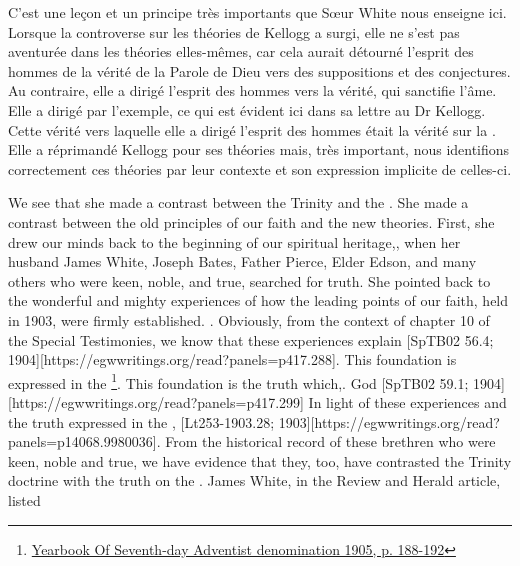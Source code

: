 C'est une leçon et un principe très importants que Sœur White nous enseigne ici. Lorsque la controverse sur les théories de Kellogg a surgi, elle ne s'est pas aventurée dans les théories elles-mêmes, car cela aurait détourné l'esprit des hommes de la vérité de la Parole de Dieu vers des suppositions et des conjectures. Au contraire, elle a dirigé l'esprit des hommes vers la vérité, qui sanctifie l'âme. Elle a dirigé par l'exemple, ce qui est évident ici dans sa lettre au Dr Kellogg. Cette vérité vers laquelle elle a dirigé l'esprit des hommes était la vérité sur la . Elle a réprimandé Kellogg pour ses théories mais, très important, nous identifions correctement ces théories par leur contexte et son expression implicite de celles-ci.


We see that she made a contrast between the Trinity and the . She made a contrast between the old principles of our faith and the new theories. First, she drew our minds back to the beginning of our spiritual heritage,, when her husband James White, Joseph Bates, Father Pierce, Elder Edson, and many others who were keen, noble, and true, searched for truth. She pointed back to the wonderful and mighty experiences of how the leading points of our faith, held in 1903, were firmly established.   . Obviously, from the context of chapter 10 of the Special Testimonies, we know that these experiences explain [SpTB02 56.4; 1904][https://egwwritings.org/read?panels=p417.288]. This foundation is expressed in the \footnote{\href{https://static1.squarespace.com/static/554c4998e4b04e89ea0c4073/t/59d17e24c027d84167e17617/1506901547915/SDA-YB1905+\%28P.+188-192\%29.pdf}{Yearbook Of Seventh-day Adventist denomination 1905, p. 188-192}}. This foundation is the truth which,. God [SpTB02 59.1; 1904][https://egwwritings.org/read?panels=p417.299] In light of these experiences and the truth expressed in the , [Lt253-1903.28; 1903][https://egwwritings.org/read?panels=p14068.9980036]. From the historical record of these brethren who were keen, noble and true, we have evidence that they, too, have contrasted the Trinity doctrine with the truth on the . James White, in the Review and Herald article, listed 